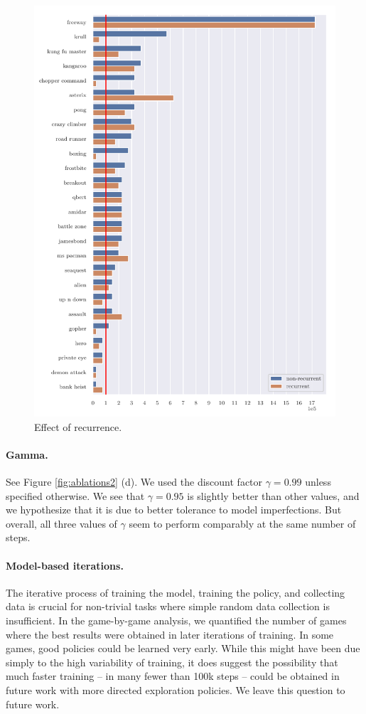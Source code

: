 \begin{figure}
\centering
\includegraphics[width=0.9\columnwidth]{figures/graph_Effect_of_a_recurrent_architecture.pdf}
\caption{Effect of recurrence.}
\label{fig:comp_recurr}
\end{figure}



\paragraph{Gamma.} See Figure \ref{fig:ablations2} (d). We used the discount factor $\gamma=0.99$ unless specified otherwise.  We see that $\gamma=0.95$ is slightly better than other values, and we hypothesize that it is due to better tolerance to model imperfections. But overall, all three values of $\gamma$ seem to perform comparably at the same number of steps.

\paragraph{Model-based iterations.}
The iterative process of training the model, training the policy, and collecting data is crucial for non-trivial tasks where simple random data collection is insufficient. In the game-by-game analysis, we quantified the number of games where the best results were obtained in later iterations of training. In some games, good policies could be learned very early. While this might have been due simply to the high variability of training, it does suggest the possibility that much faster training -- in many fewer than 100k steps -- could be obtained in future work with more directed exploration policies. We leave this question to future work.


